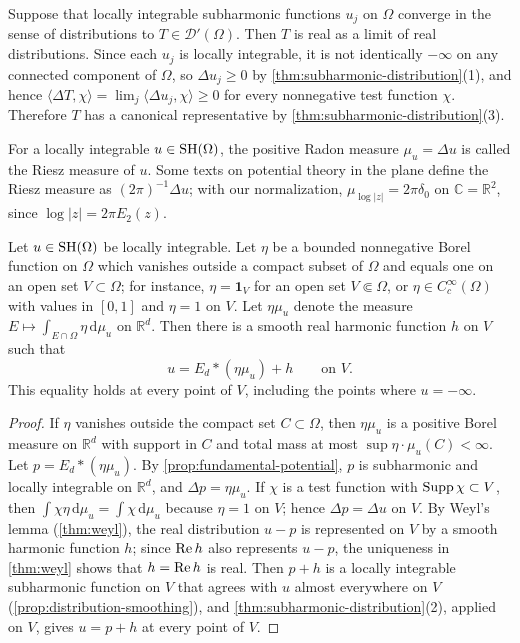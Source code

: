 Suppose that locally integrable subharmonic functions $u_j$ on $\Omega$ converge in the sense of distributions to $T\in\mathcal D'(\Omega)$. Then $T$ is real as a limit of real distributions. Since each $u_j$ is locally integrable, it is not identically $-\infty$ on any connected component of $\Omega$, so $\Delta u_j\geq0$ by \cref{thm:subharmonic-distribution}(1), and hence $\langle\Delta T,\chi\rangle=\lim_j\langle\Delta u_j,\chi\rangle\geq0$ for every nonnegative test function $\chi$. Therefore $T$ has a canonical representative by \cref{thm:subharmonic-distribution}(3).

For a locally integrable $u\in\mathrm{SH}(\Omega)$, the positive Radon measure $\mu_u=\Delta u$ is called the Riesz measure of $u$. Some texts on potential theory in the plane define the Riesz measure as $(2\pi)^{-1}\Delta u$; with our normalization, $\mu_{\log|z|}=2\pi\delta_0$ on $\mathbb C=\mathbb R^2$, since $\log|z|=2\pi E_2(z)$.

\begin{theorem}\label{thm:riesz-decomposition}
Let $u\in\mathrm{SH}(\Omega)$ be locally integrable. Let $\eta$ be a bounded nonnegative Borel function on $\Omega$ which vanishes outside a compact subset of $\Omega$ and equals one on an open set $V\subset\Omega$; for instance, $\eta=\mathbf 1_V$ for an open set $V\Subset\Omega$, or $\eta\in C_c^\infty(\Omega)$ with values in $[0,1]$ and $\eta=1$ on $V$. Let $\eta\mu_u$ denote the measure $E\mapsto\int_{E\cap\Omega}\eta\,\mathrm d\mu_u$ on $\mathbb R^d$. Then there is a smooth real harmonic function $h$ on $V$ such that
\[
 u=E_d*(\eta\mu_u)+h\qquad\text{on }V.
\]
This equality holds at every point of $V$, including the points where $u=-\infty$.
\end{theorem}
\begin{proof}
If $\eta$ vanishes outside the compact set $C\subset\Omega$, then $\eta\mu_u$ is a positive Borel measure on $\mathbb R^d$ with support in $C$ and total mass at most $\sup\eta\cdot\mu_u(C)<\infty$. Let $p=E_d*(\eta\mu_u)$. By \cref{prop:fundamental-potential}, $p$ is subharmonic and locally integrable on $\mathbb R^d$, and $\Delta p=\eta\mu_u$. If $\chi$ is a test function with $\operatorname{Supp}\chi\subset V$, then $\int\chi\eta\,\mathrm d\mu_u=\int\chi\,\mathrm d\mu_u$ because $\eta=1$ on $V$; hence $\Delta p=\Delta u$ on $V$. By Weyl's lemma (\cref{thm:weyl}), the real distribution $u-p$ is represented on $V$ by a smooth harmonic function $h$; since $\operatorname{Re} h$ also represents $u-p$, the uniqueness in \cref{thm:weyl} shows that $h=\operatorname{Re} h$ is real. Then $p+h$ is a locally integrable subharmonic function on $V$ that agrees with $u$ almost everywhere on $V$ (\cref{prop:distribution-smoothing}), and \cref{thm:subharmonic-distribution}(2), applied on $V$, gives $u=p+h$ at every point of $V$.
\end{proof}

